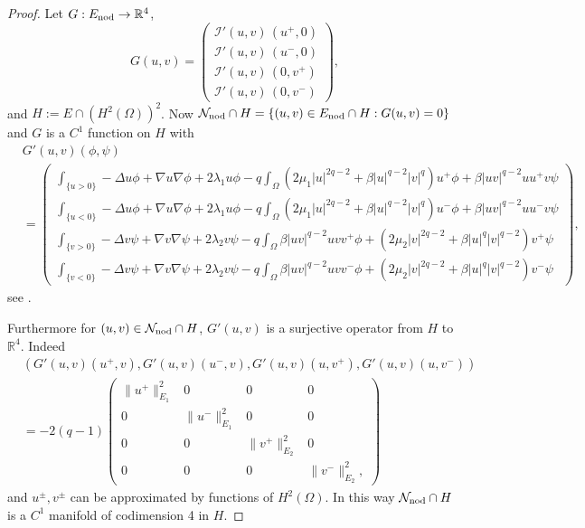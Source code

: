 \documentclass[reqno]{amsart}
\begin{document}
\begin{proof}
Let $G:E_{\rm nod}\to\mathbb{R}^4$,
\[
G(u,v)=\begin{pmatrix}
\mathcal I'(u,v) \, (u^+,0) \\ \mathcal I'(u,v) \, (u^-,0) \\
\mathcal I'(u,v) \, (0,v^+) \\ \mathcal I'(u,v) \, (0,v^-)
 \end{pmatrix},
\]
and $H:=E\cap \left(H^2(\Omega)\right)^2$.
Now $\mathcal N_{\rm nod}\cap H = \{(u,v)\in E_{\rm nod}\cap H : G(u,v)=0\}$ and $G$
is a $C^1$ function on $H$ with
\begin{align*}
&G'(u,v)(\phi,\psi) \\
&=\begin{pmatrix}
\int_{\{u>0\}} -\Delta u \phi + \nabla u \nabla \phi
 + 2\lambda_1 u \phi - q \int_{\Omega}
 \left(2\mu_1|u|^{2q-2}+\beta|u|^{q-2}|v|^q\right)u^+ \phi
 + \beta |uv|^{q-2} uu^+v\psi
\\
\int_{\{u<0\}} -\Delta u \phi + \nabla u \nabla \phi + 2\lambda_1 u \phi
 - q \int_{\Omega} \left(2\mu_1|u|^{2q-2}+\beta|u|^{q-2}|v|^q\right)u^- \phi
 + \beta |uv|^{q-2} uu^-v\psi
\\
\int_{\{v>0\}} -\Delta v \psi + \nabla v \nabla \psi + 2\lambda_2 v \psi
 - q \int_{\Omega} \beta |uv|^{q-2} uvv^+
  \phi+\left(2\mu_2|v|^{2q-2}+\beta|u|^{q}|v|^{q-2}\right)v^+ \psi
\\
\int_{\{v<0\}} -\Delta v \psi + \nabla v \nabla \psi
 + 2\lambda_2 v \psi - q \int_{\Omega} \beta |uv|^{q-2} uvv^-
 \phi+\left(2\mu_2|v|^{2q-2}+\beta|u|^{q}|v|^{q-2}\right)v^- \psi
\end{pmatrix},
\end{align*}
see \cite[Lemma 3.1]{BW_JDE06}.

Furthermore for $(u,v)\in \mathcal N_{\rm nod}\cap H$, $G'(u,v)$ is a surjective
operator from $H$ to $\mathbb{R}^4$. Indeed
\begin{align*}
&\left( G'(u,v)(u^+,v), G'(u,v)(u^-,v), G'(u,v)(u,v^+), G'(u,v)(u,v^-) \right) \\
& = -2(q-1)\begin{pmatrix} \|u^+\|_{E_1}^2 & 0 & 0 & 0 \\
 0 & \|u^-\|_{E_1}^2 & 0 & 0 \\
 0 & 0 & \|v^+\|_{E_2}^2 & 0 \\
 0 & 0& 0& \|v^-\|_{E_2}^2 ,
\end{pmatrix}
\end{align*}
and $u^{\pm}, v^{\pm}$ can be approximated by functions of $H^2(\Omega)$.
In this way $\mathcal N_{\rm nod}\cap H$ is a $C^1$ manifold of codimension 4 in
$H$.


\end{proof}
\end{document}
